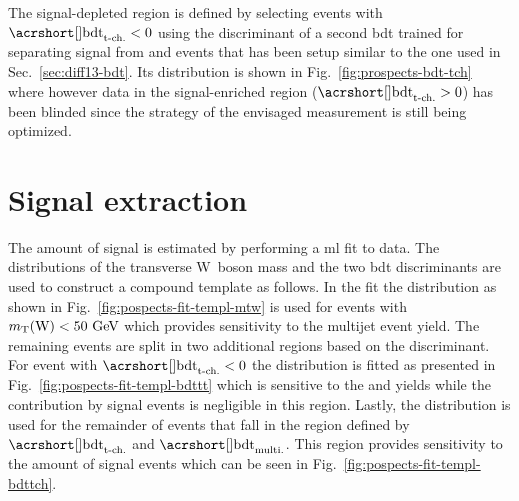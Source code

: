 
The signal-depleted region is defined by selecting events with $\bdttch<0$ using the discriminant of a second \gls{bdt} trained for separating signal from \wjets and \ttbar events that has been setup similar to the one used in Sec.~\ref{sec:diff13-bdt}. Its distribution is shown in Fig.~\ref{fig:prospects-bdt-tch} where however data in the signal-enriched region ($\bdttch>0$) has been blinded since the strategy of the envisaged measurement is still being optimized.


\section{Signal extraction}
\label{sec:prospects-fit}

The amount of signal is estimated by performing a \gls{ml} fit to data. The distributions of the transverse W~boson mass and the two \gls{bdt} discriminants are used to construct a compound template as follows. In the fit the \mtw distribution as shown in Fig.~\ref{fig:pospects-fit-templ-mtw} is used for events with $m_{\textrm{T}}(\textrm{W})<50~\textrm{GeV}$ which provides sensitivity to the multijet event yield. The remaining events are split in two additional regions based on the \bdttch discriminant. For event with $\bdttch<0$ the \bdttt distribution is fitted as presented in Fig.~\ref{fig:pospects-fit-templ-bdttt} which is sensitive to the \wjets and \ttbar yields while the contribution by signal events is negligible in this region. Lastly, the \bdttch distribution is used for the remainder of events that fall in the region defined by $\bdttch$ and $\bdtqcd$. This region provides sensitivity to the amount of signal events which can be seen in Fig.~\ref{fig:pospects-fit-templ-bdttch}.

